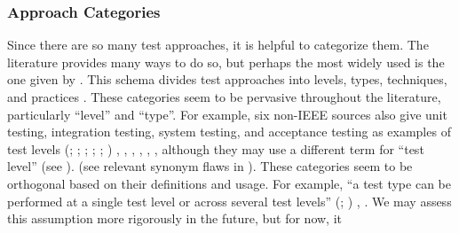 
\subsubsection{Approach Categories}\label{cats-def}

Since there are so many test approaches, it is helpful to categorize them.
The literature provides many ways to do so, but perhaps the most widely used
is the one given by \ifnotpaper\else \citeauthor{IEEE2022} \fi \citet{IEEE2022}.
This schema divides test approaches into levels, types, techniques, and practices
\citeyearpar[Fig.~2; see ]{IEEE2022}. These categories seem
to be pervasive throughout the literature, particularly ``level'' and ``type''.
\label{nonIEEE-sources}%
For example, six non-IEEE sources also give unit testing, integration testing,
system testing, and acceptance testing as examples of test levels \ifnotpaper
    (\citealp[pp.~5\=/6 to 5\=/7]{SWEBOK2024}; \citealpISTQB{};
    \citealp[pp.~807\==808]{Perry2006}; \citealp[pp.~443\==445]{PetersAndPedrycz2000};
    \citealp[p.~218]{KuļešovsEtAl2013};
    \citealp[pp.~9, 13]{Gerrard2000a})\else
    \cite[pp.~443\==445]{PetersAndPedrycz2000},
    \cite[pp.~5\=/6 to 5\=/7]{SWEBOK2024}, \cite{ISTQB},
    \cite[pp.~807\==808]{Perry2006}, \cite[pp.~9, 13]{Gerrard2000a},
    \cite[p.~218]{KuļešovsEtAl2013}\fi, although they may use a different term
for ``test level'' \ifnotpaper
    (see ).\label{orth-approach}
\else (see relevant synonym flaws in ). \fi
These categories seem to be orthogonal based on their definitions and usage.
For example, ``a test type can be performed at a single test level or across
several test levels'' \ifnotpaper
    (\citealp[p.~15]{IEEE2022}; \citeyear[p.~7]{IEEE2021})\else
    \cite[p.~15]{IEEE2022}, \cite[p.~7]{IEEE2021}\fi.
We may assess this assumption more rigorously in the future, but for now, it
